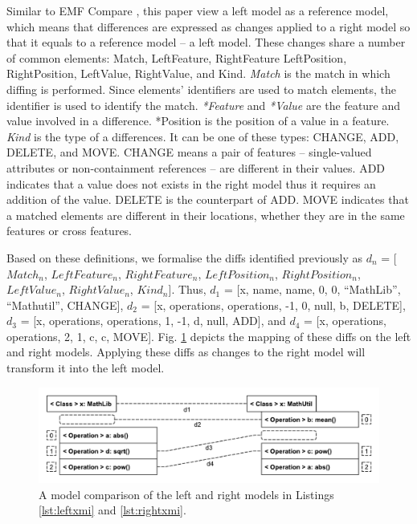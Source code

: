 \documentclass{llncs}
\begin{document}
Similar to EMF Compare \cite{emfcompare2018developer}, this paper view a left model as a reference model, which means that differences are expressed as changes applied to a right model so that it equals to a reference model -- a left model. These changes share a number of common elements: \textsf{Match}, \textsf{LeftFeature}, \textsf{RightFeature} \textsf{LeftPosition}, \textsf{RightPosition}, \textsf{LeftValue}, \textsf{RightValue}, and \textsf{Kind}. \textit{Match} is the match in which diffing is performed. Since elements' identifiers are used to match elements, the identifier is used to identify the match. \textit{*Feature} and \textit{*Value} are the feature and value involved in a difference. \textsf{*Position} is the position of a value in a feature. \textit{Kind} is the type of a differences. It can be one of these types: \textsf{CHANGE}, \textsf{ADD}, \textsf{DELETE}, and \textsf{MOVE}. \textsf{CHANGE} means a pair of features -- single-valued attributes or non-containment references -- are different in their values. \textsf{ADD} indicates that a value does not exists in the right model thus it requires an addition of the value. \textsf{DELETE} is the counterpart of \textsf{ADD}. \textsf{MOVE} indicates that a matched elements are different in their locations, whether they are in the same features or cross features. 
    
Based on these definitions, we formalise the diffs identified previously as $d_n$ = [$Match_n$, $LeftFeature_n$, $RightFeature_n$, $LeftPosition_n$, $RightPosition_n$, $LeftValue_n$, $RightValue_n$, $Kind_n$]. Thus, $d_1$ =  [\textsf{x}, \textsf{name}, \textsf{name}, 0, 0, ``MathLib'', ``Mathutil'', \textsf{CHANGE}], $d_2$ = [\textsf{x}, \textsf{operations}, \textsf{operations}, -1, 0, \textsf{null}, \textsf{b}, \textsf{DELETE}], $d_3$ = [\textsf{x}, \textsf{operations}, \textsf{operations}, 1, -1, \textsf{d}, \textsf{null}, \textsf{ADD}], and $d_4$ = [\textsf{x}, \textsf{operations}, \textsf{operations}, 2, 1, \textsf{c}, \textsf{c}, \textsf{MOVE}]. Fig. \ref{fig:xmi_comparison} depicts the mapping of these diffs on the left and right models. Applying these diffs as changes to the right model will transform it into the left model.  

\vspace{-20pt}
 \begin{figure}
     \includegraphics[width=\linewidth]{images/XmiComparison}
     \caption{A model comparison of the left and right models in Listings \ref{lst:leftxmi} and \ref{lst:rightxmi}.}
     \label{fig:xmi_comparison}
 \end{figure}
 
\end{document}
